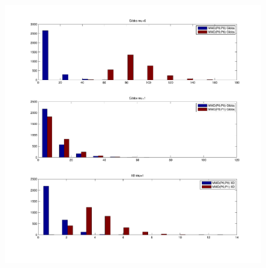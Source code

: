 \documentclass[11pt,a4paper]{report}
\begin{document}
\begin{figure}
\centering  
\includegraphics[width=1.4\textwidth]{histograms.pdf}
\label{hist}
\end{figure}
\end{document}
